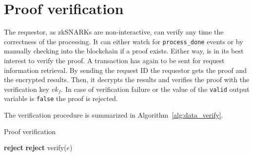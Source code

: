 \section{Proof verification}
\label{solution:flow:verify}

The requestor, as zkSNARKs are non-interactive, can verify any time the correctness of the processing. It can either watch for \verb|process_done| events or by manually checking into the blockchain if a proof exists. Either way, is in its best interest to verify the proof. A transaction has again to be sent for request information retrieval. By sending the request ID the requestor gets the proof and the encrypted results. Then, it decrypts the results and verifies the proof with the verification key $vk_f$. In case of verification failure or the value of the \verb|valid| output variable is \verb|false| the proof is rejected.

The verification procedure is summarized in Algorithm~\ref{alg:data_verify}.

\begin{algorithm}[!htb]
  \caption{Proof verification}\label{alg:data_verify}
  \begin{algorithmic}[1]
     
     
     
     
      \State \textbf{reject}
    \EndIf
     
     
      \State \textbf{reject}
    \EndIf
  \EndProcedure
     
      \State verify($e$) 
    \EndWhile
  \EndProcedure
  \end{algorithmic}
\end{algorithm}

